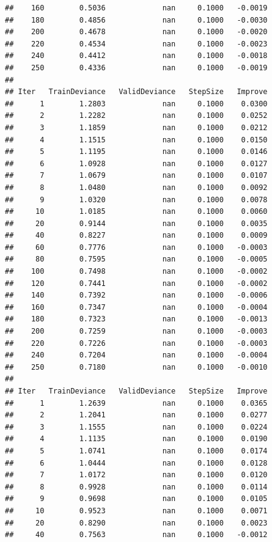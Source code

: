 \documentclass[
]{book}
\begin{document}
\begin{verbatim}
##    160        0.5036             nan     0.1000   -0.0019
##    180        0.4856             nan     0.1000   -0.0030
##    200        0.4678             nan     0.1000   -0.0020
##    220        0.4534             nan     0.1000   -0.0023
##    240        0.4412             nan     0.1000   -0.0018
##    250        0.4336             nan     0.1000   -0.0019
## 
## Iter   TrainDeviance   ValidDeviance   StepSize   Improve
##      1        1.2803             nan     0.1000    0.0300
##      2        1.2282             nan     0.1000    0.0252
##      3        1.1859             nan     0.1000    0.0212
##      4        1.1515             nan     0.1000    0.0150
##      5        1.1195             nan     0.1000    0.0146
##      6        1.0928             nan     0.1000    0.0127
##      7        1.0679             nan     0.1000    0.0107
##      8        1.0480             nan     0.1000    0.0092
##      9        1.0320             nan     0.1000    0.0078
##     10        1.0185             nan     0.1000    0.0060
##     20        0.9144             nan     0.1000    0.0035
##     40        0.8227             nan     0.1000    0.0009
##     60        0.7776             nan     0.1000   -0.0003
##     80        0.7595             nan     0.1000   -0.0005
##    100        0.7498             nan     0.1000   -0.0002
##    120        0.7441             nan     0.1000   -0.0002
##    140        0.7392             nan     0.1000   -0.0006
##    160        0.7347             nan     0.1000   -0.0004
##    180        0.7323             nan     0.1000   -0.0013
##    200        0.7259             nan     0.1000   -0.0003
##    220        0.7226             nan     0.1000   -0.0003
##    240        0.7204             nan     0.1000   -0.0004
##    250        0.7180             nan     0.1000   -0.0010
## 
## Iter   TrainDeviance   ValidDeviance   StepSize   Improve
##      1        1.2639             nan     0.1000    0.0365
##      2        1.2041             nan     0.1000    0.0277
##      3        1.1555             nan     0.1000    0.0224
##      4        1.1135             nan     0.1000    0.0190
##      5        1.0741             nan     0.1000    0.0174
##      6        1.0444             nan     0.1000    0.0128
##      7        1.0172             nan     0.1000    0.0120
##      8        0.9928             nan     0.1000    0.0114
##      9        0.9698             nan     0.1000    0.0105
##     10        0.9523             nan     0.1000    0.0071
##     20        0.8290             nan     0.1000    0.0023
##     40        0.7563             nan     0.1000   -0.0012

\end{verbatim}
\end{document}
